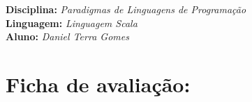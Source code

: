 



\noindent
\textbf{Disciplina:} \textit{Paradigmas de Linguagens de Programa\c{c}\~{a}o \the\year}\\
\textbf{Linguagem:} \textit{Linguagem Scala}\\
\textbf{Aluno:} \textit{Daniel Terra Gomes}


\section*{Ficha de avalia\c{c}\~{a}o:}



